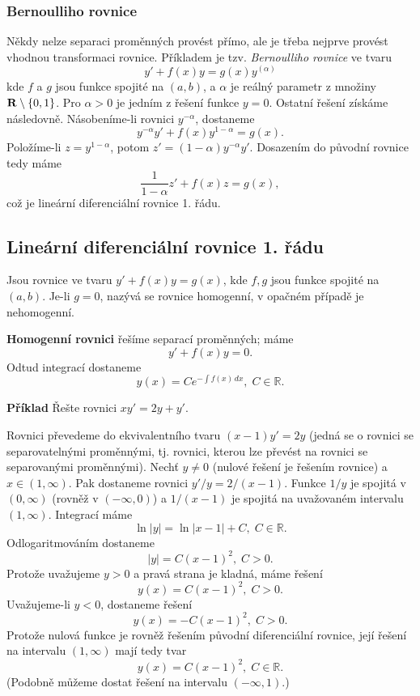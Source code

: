 \subsubsection{Bernoulliho rovnice} 
   Někdy nelze separaci proměnných provést přímo, ale je třeba nejprve provést vhodnou transformaci rovnice.
   Příkladem je tzv. {\it Bernoulliho rovnice} ve tvaru
   \[y'+f(x)y=g(x)y^(\alpha)\]
   kde $f$ a $g$ jsou funkce spojité na $(a,b)$, a $\alpha$ je reálný parametr z množiny ${\rm\bf R}\setminus\{0,1\}$.
   Pro $\alpha>0$ je jedním z řešení funkce $y=0$. Ostatní řešení získáme následovně.
   Násobeníme-li rovnici $y^{-\alpha}$, dostaneme
   \[
      y^{-\alpha}y' + f(x)y^{1-\alpha} = g(x).
   \]
   Položíme-li $z=y^{1-\alpha}$, potom $z'=(1-\alpha)y^{-\alpha}y'$.
   Dosazením do původní rovnice tedy máme
   \[
      \frac{1}{1-\alpha}z' + f(x)z = g(x),
   \]
   což je lineární diferenciální rovnice 1. řádu.
  
\subsection{Lineární diferenciální rovnice 1. řádu}
   Jsou rovnice ve tvaru $y'+f(x)y=g(x)$, kde $f,g$ jsou funkce spojité na $(a,b)$.
   Je-li $g=0$, nazývá se rovnice homogenní, v opačném případě je nehomogenní.
   
   {\bf Homogenní rovnici} řešíme separací proměnných; máme
   \[
      y'+f(x)y = 0.
   \]
   Odtud integrací dostaneme
   \[
      y(x) = Ce^{-\int f(x)\,dx}, \; C\in\mathbb{R}.
   \]

   {\bf Příklad}
   Řešte rovnici $xy'=2y+y'$.

   Rovnici převedeme do ekvivalentního tvaru $(x-1)y'=2y$ (jedná se o rovnici se separovatelnými proměnnými,
   tj. rovnici, kterou lze převést na rovnici se separovanými proměnnými).
   Nechť $y\neq 0$ (nulové řešení je řešením rovnice) a $x\in(1,\infty)$.
   Pak dostaneme rovnici $y'/y=2/(x-1)$. Funkce $1/y$ je spojitá v $(0,\infty)$ (rovněž v $(-\infty,0)$)
   a $1/(x-1)$ je spojitá na uvažovaném intervalu $(1,\infty)$.
   Integrací máme
   \[
      \ln|y| = \ln|x-1|+C, \; C\in\mathbb{R}.
   \]
   Odlogaritmováním dostaneme
   \[
      |y| = C(x-1)^2, \; C>0.
   \]
   Protože uvažujeme $y>0$ a pravá strana je kladná, máme řešení
   \[
      y(x) = C(x-1)^2, \; C>0.
   \] 
   Uvažujeme-li $y<0$, dostaneme řešení
   \[
      y(x) = -C(x-1)^2, \;C>0.
   \]
   Protože nulová funkce je rovněž řešením původní diferenciální rovnice,
   její řešení na intervalu $(1,\infty)$ mají tedy tvar
   \[
      y(x) = C(x-1)^2, \; C\in\mathbb{R}.
   \]
   (Podobně můžeme dostat řešení na intervalu $(-\infty,1)$.)

